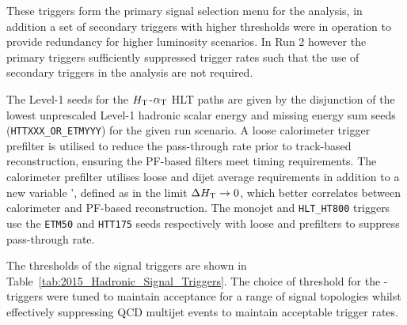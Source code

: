 These triggers form the primary signal selection menu for the analysis, in addition a set of secondary triggers with 
higher thresholds were in operation to provide redundancy for higher luminosity scenarios. In Run 2 however the primary 
triggers sufficiently suppressed trigger rates such that the use of secondary triggers in the analysis are not required.


The Level-1 seeds for the $\mbox{$H_\text{T}$}$-$\alpha_{\text{T}}$ HLT paths are given by the disjunction of the lowest 
unprescaled Level-1 hadronic scalar energy and missing energy sum seeds (\verb!HTTXXX_OR_ETMYYY!) for 
the given run scenario. A loose calorimeter trigger prefilter is utilised to reduce the pass-through 
rate prior to track-based reconstruction, ensuring the PF-based filters meet timing requirements. The calorimeter prefilter 
utilises loose \scalht and dijet average \pt requirements in addition to a new variable \alphat', 
defined as \alphat in the limit $\Delta\mbox{$H_\text{T}$} \rightarrow 0$, which better correlates \alphat 
between calorimeter and PF-based reconstruction. The monojet and \verb!HLT_HT800! triggers use the
\verb!ETM50! and \verb!HTT175! seeds respectively with loose \mht and \scalht prefilters to suppress pass-through rate.

The thresholds of the signal triggers are shown in Table~\ref{tab:2015_Hadronic_Signal_Triggers}. The choice of threshold for 
the \scalht-\alphat triggers were tuned to maintain acceptance for a range of signal topologies whilst effectively suppressing QCD 
multijet events to maintain acceptable trigger rates. 




